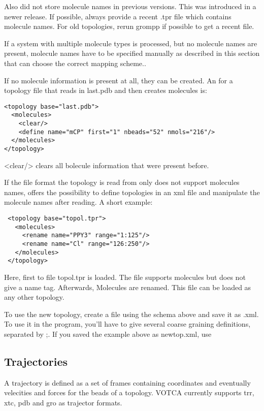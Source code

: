 Also \gromacs did not store molecule names in previous versions. This was introduced in a newer release. If possible, always provide a recent .tpr file which contains molecule names. For old topologies, rerun grompp if possible to get a recent file.

If a system with multiple molecule types is processed, but no molecule names are present, molecule names have to be specified manually as described in this section that \votca can choose the correct mapping scheme..

If no molecule information is present at all, they can be created. An for a topology file that reads in last.pdb and then creates molecules is:
\begin{verbatim}
<topology base="last.pdb">
  <molecules>
    <clear/>
    <define name="mCP" first="1" nbeads="52" nmols="216"/>
  </molecules>
</topology>
\end{verbatim}
<clear/> clears all bolecule information that were present before.

If the file format the topology is read from only does not support molecules names, \votca offers the possibility to define topologies in an xml file and manipulate the molecule names after reading. A short example:
\begin{verbatim}
 <topology base="topol.tpr">
   <molecules>
     <rename name="PPY3" range="1:125"/>
     <rename name="Cl" range="126:250"/>
   </molecules>
 </topology>
\end{verbatim}
Here, first to file topol.tpr is loaded. The file supports molecules but does not give a name tag. Afterwards, Molecules are renamed. This file can be loaded as any other topology.

To use the new topology, create a file using the schema above and save it as .xml. To use it in the program, you'll have to give several coarse graining definitions, separated by ;. If you saved the example above as newtop.xml, use 

\subsection{Trajectories}
A trajectory is defined as a set of frames containing coordinates and eventually velecities and forces for the beads of a topology.
VOTCA currently supports trr, xtc, pdb and gro as trajector formats.






